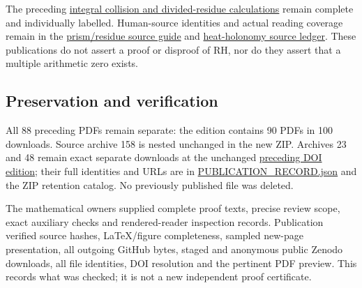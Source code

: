 \documentclass[
]{article}
\begin{document}
The preceding
\href{https://github.com/KokunoYumeto/zeta-function-research-reader/tree/3c022a0adde0a6aa3d8fc8e43ef42795d88e44b0/workbenches/splitzero-tandem/branches/tau-zero-prime-positivity/research_calculations}{integral
collision and divided-residue calculations} remain complete and
individually labelled. Human-source identities and actual reading
coverage remain in the
\href{https://github.com/KokunoYumeto/zeta-function-research-reader/blob/3c022a0adde0a6aa3d8fc8e43ef42795d88e44b0/workbenches/splitzero-tandem/branches/tau-zero-prime-positivity/SOURCES.md}{prism/residue
source guide} and
\href{https://github.com/KokunoYumeto/zeta-function-research-reader/blob/3c022a0adde0a6aa3d8fc8e43ef42795d88e44b0/workbenches/splitzero-tandem/continuations/20260923-supported-zero-collision-holonomy/SOURCE_READING_AND_USE.json}{heat-holonomy
source ledger}. These publications do not assert a proof or disproof of
RH, nor do they assert that a multiple arithmetic zero exists.

\subsection{Preservation and
verification}\label{preservation-and-verification}

All 88 preceding PDFs remain separate: the edition contains 90 PDFs in
100 downloads. Source archive 158 is nested unchanged in the new ZIP.
Archives 23 and 48 remain exact separate downloads at the unchanged
\href{https://zenodo.org/records/22908213}{preceding DOI edition}; their
full identities and URLs are in \url{PUBLICATION_RECORD.json} and the
ZIP retention catalog. No previously published file was deleted.

The mathematical owners supplied complete proof texts, precise review
scope, exact auxiliary checks and rendered-reader inspection records.
Publication verified source hashes, LaTeX/figure completeness, sampled
new-page presentation, all outgoing GitHub bytes, staged and anonymous
public Zenodo downloads, all file identities, DOI resolution and the
pertinent PDF preview. This records what was checked; it is not a new
independent proof certificate.
\end{document}
